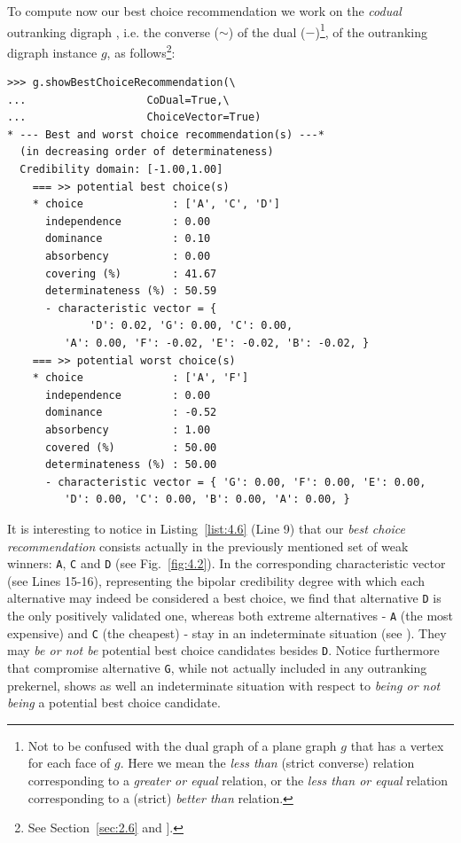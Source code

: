 To compute now our \Rubis best choice recommendation we work on the \emph{codual} outranking digraph , i.e. the converse ($\sim$) of the dual ($-$)\footnote{Not to be confused with the dual graph of a plane graph $g$ that has a vertex for each face of $g$. Here we mean the \emph{less than} (strict converse) relation corresponding to a \emph{greater or equal} relation, or the \emph{less than or equal} relation corresponding to a (strict) \emph{better than} relation.}, of the outranking digraph instance $g$, as follows\footnote{See Section~\ref{sec:2.6} and \citet{BIS-2013}].}:
\begin{lstlisting}[caption={Computing the best choice recommendation},label=list:4.6]
>>> g.showBestChoiceRecommendation(\
...                   CoDual=True,\
...                   ChoiceVector=True)   
* --- Best and worst choice recommendation(s) ---*
  (in decreasing order of determinateness)   
  Credibility domain: [-1.00,1.00]
    === >> potential best choice(s)
    * choice              : ['A', 'C', 'D']
      independence        : 0.00
      dominance           : 0.10
      absorbency          : 0.00
      covering (%)        : 41.67
      determinateness (%) : 50.59
      - characteristic vector = {
             'D': 0.02, 'G': 0.00, 'C': 0.00,
	     'A': 0.00, 'F': -0.02, 'E': -0.02, 'B': -0.02, }
    === >> potential worst choice(s) 
    * choice              : ['A', 'F']
      independence        : 0.00
      dominance           : -0.52
      absorbency          : 1.00
      covered (%)         : 50.00
      determinateness (%) : 50.00
      - characteristic vector = { 'G': 0.00, 'F': 0.00, 'E': 0.00,
	     'D': 0.00, 'C': 0.00, 'B': 0.00, 'A': 0.00, }
\end{lstlisting}				  
It is interesting to notice in Listing~\ref{list:4.6} (Line 9) that our \emph{best choice recommendation} consists actually in the previously mentioned set of weak \Condorcet winners: \texttt{A}, \texttt{C} and \texttt{D} (see Fig.~\ref{fig:4.2}). In the corresponding characteristic vector (see Lines 15-16), representing the bipolar credibility degree with which each alternative may indeed be considered a best choice, we find that alternative \texttt{D} is the only positively validated one, whereas both extreme alternatives - \texttt{A} (the most expensive) and \texttt{C} (the cheapest) - stay in an indeterminate situation (see \citet{BIS-2006a,BIS-2006b}). They may \emph{be or not be} potential best choice candidates besides \texttt{D}. Notice furthermore that compromise alternative \texttt{G}, while not actually included in any outranking prekernel, shows as well an indeterminate situation with respect to \emph{being or not being} a potential best choice candidate.

